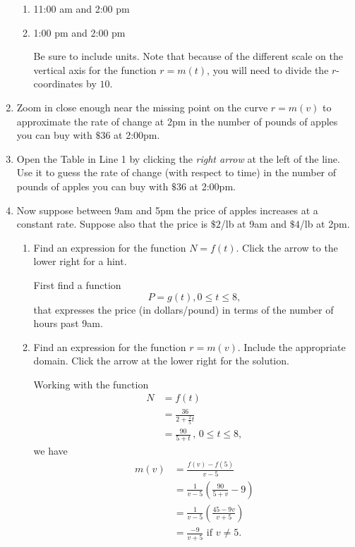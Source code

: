 \documentclass{ximera}
\begin{document}
\begin{question}
\begin{enumerate}
\begin{enumerate}
\item 11:00 am and 2:00 pm

\item 1:00 pm and 2:00 pm

Be sure to include units. Note that because of the different  scale on the vertical axis for the function $r=m(t)$, you will need to divide the $r$-coordinates by $10$.

\end{enumerate}

\item Zoom in close enough near the missing point on the curve $r=m(v)$ to approximate the rate of change at 2pm in the number of pounds of apples you can buy with $\$36$  at 2:00pm.

\item Open the Table in Line 1 by clicking the \emph{right arrow} at the left of the line. Use it to guess the rate of change (with respect to time) in the number of pounds of apples you can buy with $\$36$  at 2:00pm.

\item Now suppose between 9am and 5pm the price of apples increases at a constant rate. Suppose also that the price is $\$2$/lb at 9am and $\$4$/lb at 2pm. 

\begin{enumerate}
\item Find an expression for the function $N=f(t)$. Click the arrow to the lower right for a hint.

\begin{expandable}
First find a function 
\[
     P = g(t), 0\leq t \leq 8,
\]
that expresses the price (in dollars/pound) in terms of the number of hours past 9am.
\end{expandable}

\item Find an expression for the function $r=m(v)$. Include the appropriate domain. Click the arrow at the lower right for the solution.

\begin{expandable}
Working with the function
\begin{align*}
         N  &= f(t)  \\
             &= \frac{36}{2+\frac{2}{5}t}  \\
             &= \frac{90}{5+t} \, , \, 0\leq t \leq 8,
\end{align*}
we have
\begin{align*}
 m(v) &= \frac{f(v)-f(5)}{v-5} \\
         &= \frac{1}{v-5} \left(   \frac{90}{5+v} - 9   \right) \\
         &= \frac{1}{v-5} \left(   \frac{45-9v}{v+5}  \right) \\
         &= \frac{-9}{v+5} \text{ if } v\neq 5 .
\end{align*}


\end{expandable}
\end{enumerate}
\end{enumerate}
\end{question}
\end{document}
